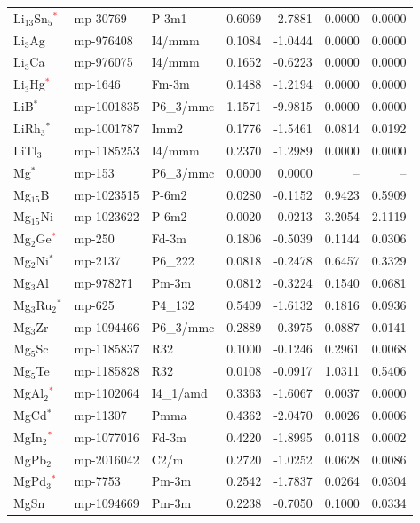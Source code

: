 \begin{longtable}{@{}lllrrrr@{}}
Li$_{13}$Sn$_{5}$\textcolor{red}{$^*$} & mp-30769 & P-3m1 & 0.6069 & -2.7881 & 0.0000 & 0.0000 \\
Li$_{3}$Ag & mp-976408 & I4/mmm & 0.1084 & -1.0444 & 0.0000 & 0.0000 \\
Li$_{3}$Ca & mp-976075 & I4/mmm & 0.1652 & -0.6223 & 0.0000 & 0.0000 \\
Li$_{3}$Hg\textcolor{red}{$^*$} & mp-1646 & Fm-3m & 0.1488 & -1.2194 & 0.0000 & 0.0000 \\
LiB$^*$ & mp-1001835 & P6\_3/mmc & 1.1571 & -9.9815 & 0.0000 & 0.0000 \\
LiRh$_{3}$$^*$ & mp-1001787 & Imm2 & 0.1776 & -1.5461 & 0.0814 & 0.0192 \\
LiTl$_{3}$ & mp-1185253 & I4/mmm & 0.2370 & -1.2989 & 0.0000 & 0.0000 \\
Mg$^*$ & mp-153 & P6\_3/mmc & 0.0000 & 0.0000 & -- & -- \\
Mg$_{15}$B & mp-1023515 & P-6m2 & 0.0280 & -0.1152 & 0.9423 & 0.5909 \\
Mg$_{15}$Ni & mp-1023622 & P-6m2 & 0.0020 & -0.0213 & 3.2054 & 2.1119 \\
Mg$_{2}$Ge\textcolor{red}{$^*$} & mp-250 & Fd-3m & 0.1806 & -0.5039 & 0.1144 & 0.0306 \\
Mg$_{2}$Ni$^*$ & mp-2137 & P6\_222 & 0.0818 & -0.2478 & 0.6457 & 0.3329 \\
Mg$_{3}$Al & mp-978271 & Pm-3m & 0.0812 & -0.3224 & 0.1540 & 0.0681 \\
Mg$_{3}$Ru$_{2}$$^*$ & mp-625 & P4\_132 & 0.5409 & -1.6132 & 0.1816 & 0.0936 \\
Mg$_{3}$Zr & mp-1094466 & P6\_3/mmc & 0.2889 & -0.3975 & 0.0887 & 0.0141 \\
Mg$_{5}$Sc & mp-1185837 & R32 & 0.1000 & -0.1246 & 0.2961 & 0.0068 \\
Mg$_{5}$Te & mp-1185828 & R32 & 0.0108 & -0.0917 & 1.0311 & 0.5406 \\
MgAl$_{2}$\textcolor{red}{$^*$} & mp-1102064 & I4\_1/amd & 0.3363 & -1.6067 & 0.0037 & 0.0000 \\
MgCd$^*$ & mp-11307 & Pmma & 0.4362 & -2.0470 & 0.0026 & 0.0006 \\
MgIn$_{2}$\textcolor{red}{$^*$} & mp-1077016 & Fd-3m & 0.4220 & -1.8995 & 0.0118 & 0.0002 \\
MgPb$_{2}$ & mp-2016042 & C2/m & 0.2720 & -1.0252 & 0.0628 & 0.0086 \\
MgPd$_{3}$\textcolor{red}{$^*$} & mp-7753 & Pm-3m & 0.2542 & -1.7837 & 0.0264 & 0.0304 \\
MgSn & mp-1094669 & Pm-3m & 0.2238 & -0.7050 & 0.1000 & 0.0334 \\

\end{longtable}
